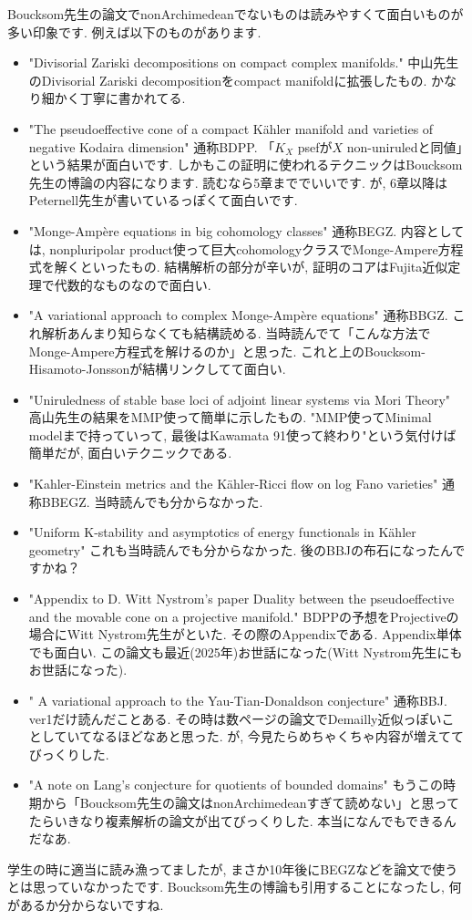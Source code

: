 Boucksom先生の論文でnonArchimedeanでないものは読みやすくて面白いものが多い印象です. 
例えば以下のものがあります.
\vspace{-8pt}
\begin{itemize}[left=0pt]
  \setlength{\parskip}{0cm} %
  \setlength{\itemsep}{0cm} %
  \item "Divisorial Zariski decompositions on compact complex manifolds." 中山先生のDivisorial Zariski decompositionをcompact manifoldに拡張したもの. かなり細かく丁寧に書かれてる. 
  \item "The pseudoeffective cone of a compact Kähler manifold and varieties of negative Kodaira dimension" 通称BDPP. 「$K_X$ psefが$X$ non-uniruledと同値」という結果が面白いです. しかもこの証明に使われるテクニックはBoucksom先生の博論の内容になります. 読むなら5章まででいいです. が, 6章以降はPeternell先生が書いているっぽくて面白いです.
  \item "Monge-Ampère equations in big cohomology classes" 通称BEGZ. 内容としては, nonpluripolar product使って巨大cohomologyクラスでMonge-Ampere方程式を解くといったもの. 結構解析の部分が辛いが, 証明のコアはFujita近似定理で代数的なものなので面白い. 
  \item  "A variational approach to complex Monge-Ampère equations" 通称BBGZ. これ解析あんまり知らなくても結構読める. 当時読んでて「こんな方法でMonge-Ampere方程式を解けるのか」と思った. これと上のBoucksom-Hisamoto-Jonssonが結構リンクしてて面白い. 
  \item "Uniruledness of stable base loci of adjoint linear systems via Mori Theory" 高山先生の結果をMMP使って簡単に示したもの. "MMP使ってMinimal modelまで持っていって, 最後はKawamata 91使って終わり"という気付けば簡単だが, 面白いテクニックである.
  \item "Kahler-Einstein metrics and the Kähler-Ricci flow on log Fano varieties" 通称BBEGZ. 当時読んでも分からなかった. 
  \item "Uniform K-stability and asymptotics of energy functionals in Kähler geometry" これも当時読んでも分からなかった. 後のBBJの布石になったんですかね？
  \item "Appendix to D. Witt Nystrom's paper Duality between the pseudoeffective and the movable cone on a projective manifold." BDPPの予想をProjectiveの場合にWitt Nystrom先生がといた. その際のAppendixである. Appendix単体でも面白い. この論文も最近(2025年)お世話になった(Witt Nystrom先生にもお世話になった).
  \item " A variational approach to the Yau-Tian-Donaldson conjecture" 通称BBJ. ver1だけ読んだことある. その時は数ページの論文でDemailly近似っぽいことしていてなるほどなあと思った. が, 今見たらめちゃくちゃ内容が増えててびっくりした. 
  \item "A note on Lang's conjecture for quotients of bounded domains" もうこの時期から「Boucksom先生の論文はnonArchimedeanすぎて読めない」と思ってたらいきなり複素解析の論文が出てびっくりした. 本当になんでもできるんだなあ.
    \end{itemize}
学生の時に適当に読み漁ってましたが, まさか10年後にBEGZなどを論文で使うとは思っていなかったです.
Boucksom先生の博論も引用することになったし, 何があるか分からないですね. 
  \vspace{8pt}


